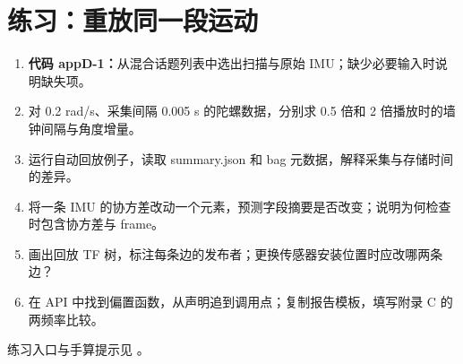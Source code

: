 \section{练习：重放同一段运动}
\begin{enumerate}
\item \textbf{代码 appD-1：}从混合话题列表中选出扫描与原始 IMU；缺少必要输入时说明缺失项。
\item 对 0.2 rad/s、采集间隔 0.005 s 的陀螺数据，分别求 0.5 倍和 2 倍播放时的墙钟间隔与角度增量。
\item 运行自动回放例子，读取 summary.json 和 bag 元数据，解释采集与存储时间的差异。
\item 将一条 IMU 的协方差改动一个元素，预测字段摘要是否改变；说明为何检查时包含协方差与 frame。
\item 画出回放 TF 树，标注每条边的发布者；更换传感器安装位置时应改哪两条边？
\item 在 API 中找到偏置函数，从声明追到调用点；复制报告模板，填写附录 C 的两频率比较。
\end{enumerate}
练习入口与手算提示见 。
